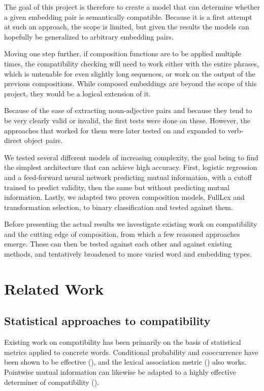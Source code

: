 \documentclass[a4paper, 12pt]{article}
\begin{document}
The goal of this project is therefore to create a model that can determine whether a given embedding pair is semantically compatible. Because it is a first attempt at such an approach, the scope is limited, but given the results the models can hopefully be generalized to arbitrary embedding pairs.

Moving one step further, if composition functions are to be applied multiple times, the compatibility checking will need to work either with the entire phrases, which is untenable for even slightly long sequences, or work on the output of the previous compositions. While composed embeddings are beyond the scope of this project, they would be a logical extension of it.

Because of the ease of extracting noun-adjective pairs and because they tend to be very clearly valid or invalid, the first tests were done on these. However, the approaches that worked for them were later tested on and expanded to verb-direct object pairs.

We tested several different models of increasing complexity, the goal being to find the simplest architecture that can achieve high accuracy. First, logistic regression and a feed-forward neural network predicting mutual information, with a cutoff trained to predict validity, then the same but without predicting mutual information. Lastly, we adapted two proven composition models, FullLex and transformation selection, to binary classification and tested against them.

Before presenting the actual results we investigate existing work on compatibility and the cutting edge of composition, from which a few reasoned approaches emerge. These can then be tested against each other and against existing methods, and tentatively broadened to more varied word and embedding types.


\section{Related Work}

\subsection{Statistical approaches to compatibility}

Existing work on compatibility has been primarily on the basis of statistical metrics applied to concrete words. Conditional probability and cooccurrence have been shown to be effective (\cite{Volk}), and the lexical association metric (\cite{HindleRooth}) also works. Pointwise mutual information can likewise be adapted to a highly effective determiner of compatibility (\cite{vanNoord}).
\end{document}
